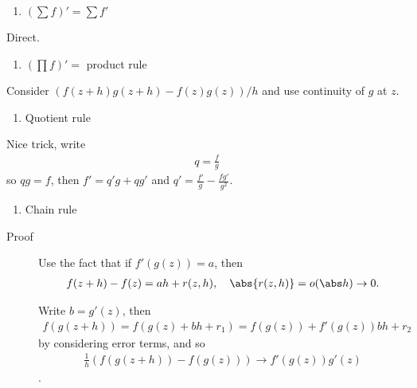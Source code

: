 \begin{enumerate}
\def\labelenumi{\arabic{enumi}.}
\tightlist
\item
  \((\sum f)' = \sum f'\)
\end{enumerate}

\begin{description}
\tightlist
\item[Proof]
Direct.
\end{description}

\begin{enumerate}
\def\labelenumi{\arabic{enumi}.}
\setcounter{enumi}{1}
\tightlist
\item
  \((\prod f)' =\) product rule
\end{enumerate}

\begin{description}
\tightlist
\item[Proof]
Consider \((f(z+h)g(z+h) - f(z)g(z))/h\) and use continuity of \(g\) at
\(z\).
\end{description}

\begin{enumerate}
\def\labelenumi{\arabic{enumi}.}
\setcounter{enumi}{2}
\tightlist
\item
  Quotient rule
\end{enumerate}

\begin{description}
\tightlist
\item[Proof]
Nice trick, write
\begin{align*}q = \frac f g\end{align*} so \(qg = f\), then
\(f' = q'g + qg'\) and \(q' = \frac {f'} g - \frac{fg'}{g^2}\).
\end{description}

\begin{enumerate}
\def\labelenumi{\arabic{enumi}.}
\setcounter{enumi}{3}
\tightlist
\item
  Chain rule
\end{enumerate}

\begin{description}
\item[Proof]
Use the fact that if \(f'(g(z)) = a\), then
\begin{align*}f(z+h) - f(z) = a h + r(z, h),\quad \abs{r(z, h)} = o(\abs h) \to 0.\end{align*}

Write \(b = g'(z)\), then
\begin{align*}f(g(z + h)) = f(g(z) + b h + r_1 ) = f(g(z)) + f'(g(z))bh + r_2\end{align*}
by considering error terms, and so
\begin{align*}\frac 1 h (f(g(z+h)) - f(g(z))) \to f'(g(z)) g'(z)\end{align*}.
\end{description}


